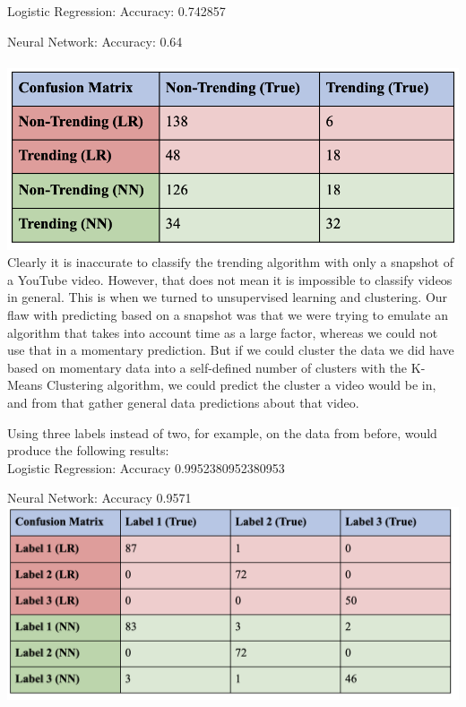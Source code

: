 \documentclass{article}
\begin{document}
Logistic Regression: Accuracy: 0.742857 

Neural Network: Accuracy: 0.64 \\
\\
\includegraphics[scale=.4]{chart6.png}\\

Clearly it is inaccurate to classify the trending algorithm with only a snapshot of a YouTube video. However, that does not mean it is impossible to classify videos in general. This is when we turned to unsupervised learning and clustering. Our flaw with predicting based on a snapshot was that we were trying to emulate an algorithm that takes into account time as a large factor, whereas we could not use that in a momentary prediction. But if we could cluster the data we did have based on momentary data into a self-defined number of clusters with the K-Means Clustering algorithm, we could predict the cluster a video would be in, and from that gather general data predictions about that video.

Using three labels instead of two, for example, on the data from before, would produce the following results: \\

Logistic Regression: Accuracy 0.9952380952380953

Neural Network: Accuracy 0.9571 \\

\includegraphics[scale=.4]{chart7.png}\\
\end{document}
